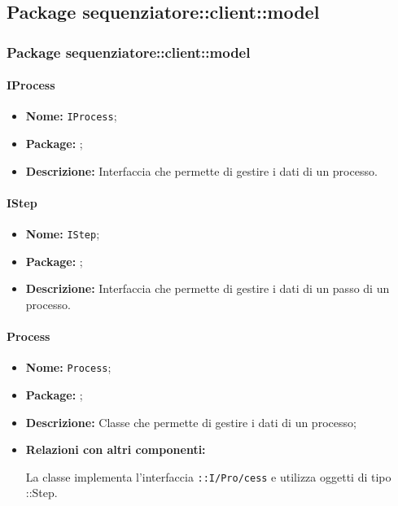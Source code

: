 \subsection{Package sequenziatore::client::model}
\subsubsection{Package sequenziatore::client::model}
\paragraph{IProcess}
\begin{itemize}
\item \textbf{Nome:} \texttt{IProcess};
\item \textbf{Package:} \texttt{\model{}};
\item \textbf{Descrizione:} Interfaccia che permette di gestire i dati di un processo.
\end{itemize}

\paragraph{IStep}
\begin{itemize}
\item \textbf{Nome:} \texttt{IStep};
\item \textbf{Package:} \texttt{\model{}};
\item \textbf{Descrizione:} Interfaccia che permette di gestire i dati di un passo di un processo.
\end{itemize}

\paragraph{Process}
\begin{flushleft}
\begin{itemize}
\item \textbf{Nome:} \texttt{Process};
\item \textbf{Package:} \texttt{\model{}};
\item \textbf{Descrizione:} Classe che permette di gestire i dati di un processo;
\item \textbf{Relazioni con altri componenti:}
\begin{sloppypar}
La classe implementa l'interfaccia \texttt{\model{}::I\fshyp{}Pro\fshyp{}cess} e utilizza oggetti di tipo \texttt{\model{}}::Step.
\end{sloppypar}
\end{itemize}
\end{flushleft}

